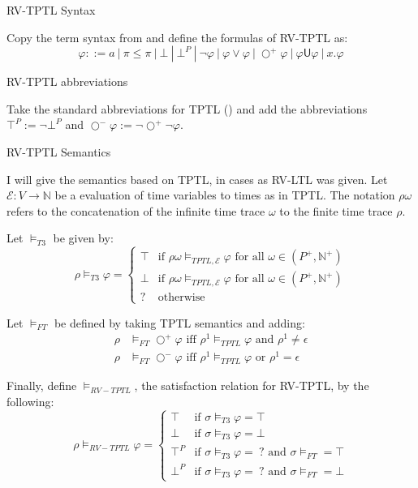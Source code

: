 \documentclass[a4paper]{article}
\newcommand{\U}{\mathsf{U}}
\newcommand{\tand}{\text{ and }}
\newcommand{\tor}{\text{ or }}
\newcommand{\tiff}{\text{ iff }}
\newcommand{\fall}{\text{ for all }}
\newcommand{\sn}{\bigcirc^+}
\newcommand{\wn}{\bigcirc^-}
\newcommand{\eval}{\mathcal{E}}
\begin{document}
\begin{defn}{RV-TPTL Syntax}

  Copy the term syntax from  and define the formulas of RV-TPTL as:
  \[\varphi ::= a ~|~ \pi \leq \pi ~|~ \bot ~|~ \bot^P ~|~ \neg \varphi ~|~\varphi \lor \varphi ~|~ \sn \varphi ~|~ \varphi \U \varphi ~|~ x. \varphi
  \]
\end{defn}
\begin{notn}{RV-TPTL abbreviations}

  Take the standard abbreviations for TPTL () and add the abbreviations \(\top^P := \neg \bot^P\) and $\wn \varphi:= \neg \sn \neg \varphi$.
\end{notn}
\begin{defn}{RV-TPTL Semantics}\label{rvtptlsem}

  I will give the semantics based on TPTL, in cases as RV-LTL was given. Let $\eval:V\to\mathbb{N}$ be a evaluation of time variables to times as in TPTL.
  The notation $\rho\omega$ refers to the concatenation of the infinite time trace $\omega$ to the finite time trace $\rho$.

  Let $\vDash_{T3}$ be given by:
  \[\rho\vDash_{T3}\varphi = \begin{cases}
      \top & \text{if } \rho\omega \vDash_{TPTL,\eval} \varphi \fall \omega \in (P^+,\mathbb{N}^+)\\
      \bot & \text{if }  \rho\omega \vDash_{TPTL,\eval} \varphi \fall \omega \in (P^+,\mathbb{N}^+)\\
      ? & \text{otherwise}
    \end{cases}
  \]

  Let $\vDash_{FT}$ be defined by taking TPTL semantics and adding:
  \begin{align*}\label{ftsem}
    \rho&\vDash_{FT}\sn\varphi \tiff \rho^1\vDash_{TPTL}\varphi \tand \rho^1 \neq \epsilon\\
    \rho&\vDash_{FT}\wn\varphi \tiff \rho^1\vDash_{TPTL}\varphi \tor \rho^1 = \epsilon
  \end{align*}

  Finally, define $\vDash_{RV-TPTL}$, the satisfaction relation for RV-TPTL, by the following:
  \[\rho\vDash_{RV-TPTL}\varphi =
    \begin{cases}
      \top & \text{if } \sigma \vDash_{T3} \varphi = \top\\
      \bot & \text{if } \sigma \vDash_{T3} \varphi = \bot\\
      \top^P & \text{if } \sigma \vDash_{T3} \varphi = ~?\tand \sigma\vDash_{FT} = \top \\
      \bot^P & \text{if } \sigma \vDash_{T3} \varphi = ~?\tand \sigma\vDash_{FT} = \bot
    \end{cases}
  \]
\end{defn}
\end{document}
